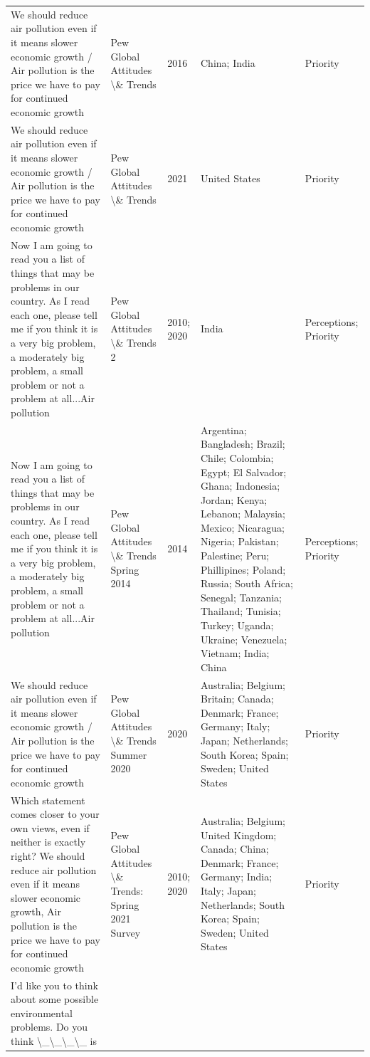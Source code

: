 {\begin{longtable}[t]{p{6cm}lp{2cm}p{4cm}p{2.5cm}}
We should reduce air pollution even if it means slower economic growth / Air pollution is the price we have to pay for continued economic growth & Pew Global Attitudes \textbackslash{}\& Trends & 2016 & China; India & Priority\\
We should reduce air pollution even if it means slower economic growth / Air pollution is the price we have to pay for continued economic growth & Pew Global Attitudes \textbackslash{}\& Trends & 2021 & United States & Priority\\
\addlinespace
Now I am going to read you a list of things that may be problems in our country. As I read each one, please tell me if you think it is a very big problem, a moderately big problem, a small problem or not a problem at all...Air pollution & Pew Global Attitudes \textbackslash{}\& Trends 2 & 2010; 2020 & India & Perceptions; Priority\\
Now I am going to read you a list of things that may be problems in our country. As I read each one, please tell me if you think it is a very big problem, a moderately big problem, a small problem or not a problem at all...Air pollution & Pew Global Attitudes \textbackslash{}\& Trends Spring 2014 & 2014 & Argentina; Bangladesh; Brazil; Chile; Colombia; Egypt; El Salvador; Ghana; Indonesia; Jordan; Kenya; Lebanon; Malaysia; Mexico; Nicaragua; Nigeria; Pakistan; Palestine; Peru; Phillipines; Poland; Russia; South Africa; Senegal; Tanzania; Thailand; Tunisia; Turkey; Uganda; Ukraine; Venezuela; Vietnam; India; China & Perceptions; Priority\\
We should reduce air pollution even if it means slower economic growth / Air pollution is the price we have to pay for continued economic growth & Pew Global Attitudes \textbackslash{}\& Trends Summer 2020 & 2020 & Australia; Belgium; Britain; Canada; Denmark; France; Germany; Italy; Japan; Netherlands; South Korea; Spain; Sweden; United States & Priority\\
Which statement comes closer to your own views, even if neither is exactly right? We should reduce air pollution even if it means slower economic growth, Air pollution is the price we have to pay for continued economic growth & Pew Global Attitudes \textbackslash{}\& Trends: Spring 2021 Survey & 2010; 2020 & Australia; Belgium; United Kingdom; Canada; China; Denmark; France; Germany; India; Italy; Japan; Netherlands; South Korea; Spain; Sweden; United States & Priority\\
I'd like you to think about some possible environmental problems. Do you think \textbackslash{}\_\textbackslash{}\_\textbackslash{}\_\textbackslash{}\_ is 

\end{longtable}}
